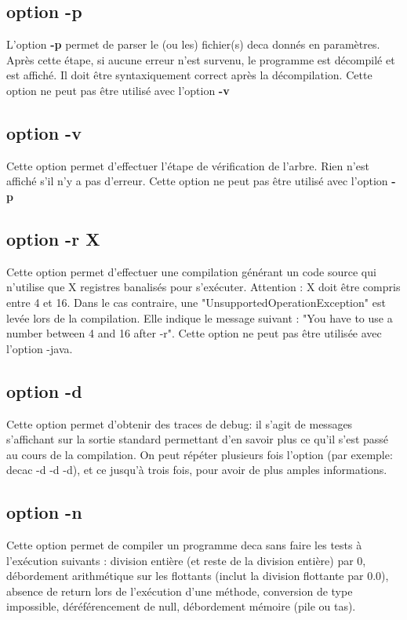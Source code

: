 \documentclass[12pt, a4paper, one side]{article}
\begin{document}
\subsection{option -p}

L'option \textbf{-p} permet de parser le (ou les) fichier(s) deca donnés en paramètres.
Après cette étape, si aucune erreur n'est survenu, le programme est décompilé et est
affiché. Il doit être syntaxiquement correct après la décompilation. Cette option ne peut
pas être utilisé avec l'option \textbf{-v}

\subsection{option -v}

Cette option permet d'effectuer l'étape de vérification de l'arbre. Rien n'est affiché s'il
n'y a pas d'erreur. Cette option ne peut pas être utilisé avec l'option \textbf{-p}

\subsection{option -r X}
Cette option permet d'effectuer une compilation générant un code source qui n'utilise que X registres banalisés pour s’exécuter. Attention : X doit être compris entre 4 et 16. Dans le cas contraire, une "UnsupportedOperationException" est levée lors de la compilation. Elle indique le message suivant : "You have to use a number between 4 and 16 after -r".
Cette option ne peut pas être utilisée avec l'option -java.

\subsection{option -d}

Cette option permet d'obtenir des traces de debug: il s'agit de messages s'affichant sur la sortie standard permettant d'en savoir plus ce qu'il s'est passé au cours de la compilation. On peut répéter plusieurs fois l'option (par exemple: decac -d -d -d), et ce jusqu'à trois fois, pour avoir de plus amples informations.

\subsection{option -n}

Cette option permet de compiler un programme deca sans faire les tests à l’exécution suivants : division entière (et reste de la division entière) par 0, débordement arithmétique sur les flottants (inclut la division flottante par 0.0), absence de return lors de l’exécution d’une méthode, conversion de type impossible, déréférencement de null, débordement mémoire (pile ou tas).
\end{document}
